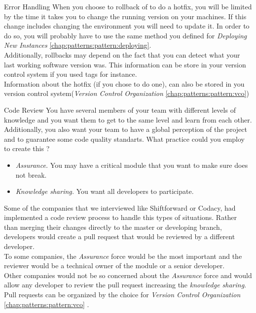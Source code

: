 \begin{pattern}{Error Handling}
    \related
    When you choose to rollback of to do a hotfix, you will be limited by the time it takes you to change the running version on your machines. If this change includes changing the environment you will need to update it. In order to do so, you will probably have to use the same method you defined for \textit{Deploying New Instances} \ref{chap:patterns:pattern:deploying}.\\
    Additionally, rollbacks may depend on the fact that you can detect what your last working software version was. This information can be store in your version control system if you used tags for instance.\\
    Information about the hotfix (if you chose to do one), can also be stored in you version control system(\textit{Version Control Organization} \ref{chap:patterns:pattern:vco})
\end{pattern}





\begin{pattern}{Code Review}  \label{chap:patterns:pattern:codereview}
    \context
    You have several members of your team with different levels of knowledge and you want them to get to the same level and learn from each other. Additionally, you also want your team to have a global perception of the project and to guarantee some code quality standarts.
    \problem
    What practice could you employ to create this ?
    \forces
    \begin{itemize}
        \item \textit{Assurance.} You may have a critical module that you want to make sure does not break.
        \item \textit{Knowledge sharing.} You want all developers to participate.
    \end{itemize}
    \solution
    Some of the companies that we interviewed like Shiftforward or Codacy, had implemented a code review process to handle this types of situations. Rather than merging their changes directly to the master or developing branch, developers would create a pull request that would be reviewed by a different developer. \\
    To some companies, the \textit{Assurance} force would be the most important and the reviewer would be a technical owner of the module or a senior developer. \\
    Other companies would not be so concerned about the \textit{Assurance} force and would allow any developer to review the pull request increasing the \textit{knowledge sharing}.
    \related
    Pull requests can be organized by the choice for \textit{Version Control Organization} \ref{chap:patterns:pattern:vco} .

\end{pattern}
